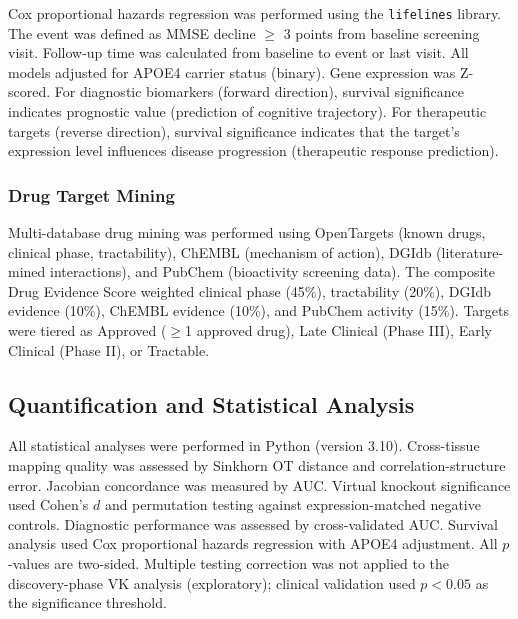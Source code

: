 \documentclass[12pt,a4paper]{article}
\begin{document}
Cox proportional hazards regression was performed using the \texttt{lifelines} library. The event was defined as MMSE decline $\geq$ 3 points from baseline screening visit. Follow-up time was calculated from baseline to event or last visit. All models adjusted for APOE4 carrier status (binary). Gene expression was Z-scored. For diagnostic biomarkers (forward direction), survival significance indicates prognostic value (prediction of cognitive trajectory). For therapeutic targets (reverse direction), survival significance indicates that the target's expression level influences disease progression (therapeutic response prediction).

\subsubsection{Drug Target Mining}

Multi-database drug mining was performed using OpenTargets (known drugs, clinical phase, tractability), ChEMBL (mechanism of action), DGIdb (literature-mined interactions), and PubChem (bioactivity screening data). The composite Drug Evidence Score weighted clinical phase (45\%), tractability (20\%), DGIdb evidence (10\%), ChEMBL evidence (10\%), and PubChem activity (15\%). Targets were tiered as Approved ($\geq$1 approved drug), Late Clinical (Phase III), Early Clinical (Phase II), or Tractable.

\subsection*{Quantification and Statistical Analysis}

All statistical analyses were performed in Python (version 3.10). Cross-tissue mapping quality was assessed by Sinkhorn OT distance and correlation-structure error. Jacobian concordance was measured by AUC. Virtual knockout significance used Cohen's $d$ and permutation testing against expression-matched negative controls. Diagnostic performance was assessed by cross-validated AUC. Survival analysis used Cox proportional hazards regression with APOE4 adjustment. All $p$-values are two-sided. Multiple testing correction was not applied to the discovery-phase VK analysis (exploratory); clinical validation used $p < 0.05$ as the significance threshold.
\end{document}
